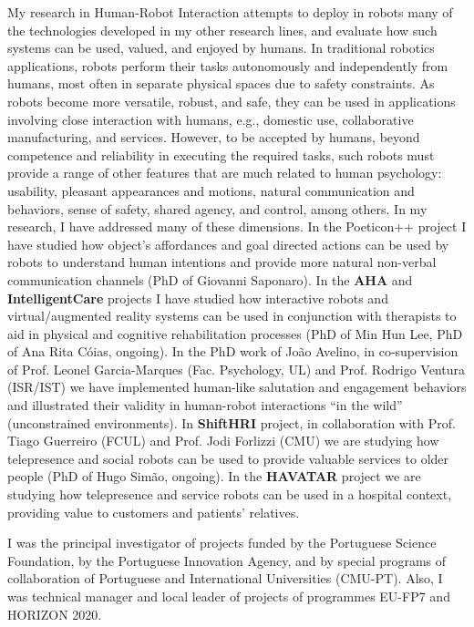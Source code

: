 \documentclass[
]{article}
\begin{document}
My research in Human-Robot Interaction attempts to deploy in robots many
of the technologies developed in my other research lines, and evaluate
how such systems can be used, valued, and enjoyed by humans. In
traditional robotics applications, robots perform their tasks
autonomously and independently from humans, most often in separate
physical spaces due to safety constraints. As robots become more
versatile, robust, and safe, they can be used in applications involving
close interaction with humans, e.g., domestic use, collaborative
manufacturing, and services. However, to be accepted by humans, beyond
competence and reliability in executing the required tasks, such robots
must provide a range of other features that are much related to human
psychology: usability, pleasant appearances and motions, natural
communication and behaviors, sense of safety, shared agency, and
control, among others. In my research, I have addressed many of these
dimensions. In the Poeticon++ project I have studied how object's
affordances and goal directed actions can be used by robots to
understand human intentions and provide more natural non-verbal
communication channels (PhD of Giovanni Saponaro). In the \textbf{AHA}
and \textbf{IntelligentCare} projects I have studied how interactive
robots and virtual/augmented reality systems can be used in conjunction
with therapists to aid in physical and cognitive rehabilitation
processes (PhD of Min Hun Lee, PhD of Ana Rita Cóias, ongoing). In the
PhD work of João Avelino, in co-supervision of Prof. Leonel
Garcia-Marques (Fac. Psychology, UL) and Prof. Rodrigo Ventura (ISR/IST)
we have implemented human-like salutation and engagement behaviors and
illustrated their validity in human-robot interactions ``in the wild''
(unconstrained environments). In \textbf{ShiftHRI} project, in
collaboration with Prof. Tiago Guerreiro (FCUL) and Prof. Jodi Forlizzi
(CMU) we are studying how telepresence and social robots can be used to
provide valuable services to older people (PhD of Hugo Simão, ongoing).
In the \textbf{HAVATAR} project we are studying how telepresence and
service robots can be used in a hospital context, providing value to
customers and patients' relatives.

I was the principal investigator of projects funded by the Portuguese
Science Foundation, by the Portuguese Innovation Agency, and by special
programs of collaboration of Portuguese and International Universities
(CMU-PT). Also, I was technical manager and local leader of projects of
programmes EU-FP7 and HORIZON 2020.
\end{document}
